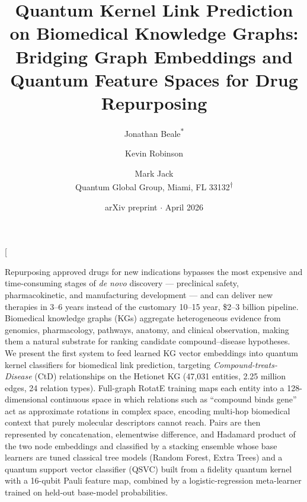 \documentclass[twocolumn,10pt]{article}
\title{\textbf{Quantum Kernel Link Prediction on Biomedical Knowledge Graphs:}\\
\textbf{Bridging Graph Embeddings and Quantum Feature Spaces for Drug Repurposing}}
\author{%
Jonathan Beale\textsuperscript{\hspace{-0.05em}$\ast$}%
\and Kevin Robinson \and Mark Jack\\
\small Quantum Global Group, Miami, FL 33132\textsuperscript{\hspace{-0.05em}$\dagger$}%
}
\date{arXiv preprint $\cdot$ April 2026}
\begin{document}
\renewcommand{\thefootnote}{\fnsymbol{footnote}}

\twocolumn[
  \maketitle
  \begin{onecolabstract}
Repurposing approved drugs for new indications bypasses the most expensive and time-consuming stages of \textit{de novo} discovery --- preclinical safety, pharmacokinetic, and manufacturing development --- and can deliver new therapies in 3--6 years instead of the customary 10--15 year, \$2--3 billion pipeline. Biomedical knowledge graphs (KGs) aggregate heterogeneous evidence from genomics, pharmacology, pathways, anatomy, and clinical observation, making them a natural substrate for ranking candidate compound--disease hypotheses. We present the first system to feed learned KG vector embeddings into quantum kernel classifiers for biomedical link prediction, targeting \textit{Compound-treats-Disease} (CtD) relationships on the Hetionet KG (47{,}031 entities, 2.25 million edges, 24 relation types). Full-graph RotatE training maps each entity into a 128-dimensional continuous space in which relations such as ``compound binds gene'' act as approximate rotations in complex space, encoding multi-hop biomedical context that purely molecular descriptors cannot reach. Pairs are then represented by concatenation, elementwise difference, and Hadamard product of the two node embeddings and classified by a stacking ensemble whose base learners are tuned classical tree models (Random Forest, Extra Trees) and a quantum support vector classifier (QSVC) built from a fidelity quantum kernel with a 16-qubit Pauli feature map, combined by a logistic-regression meta-learner trained on held-out base-model probabilities.


\end{onecolabstract}
\end{document}
